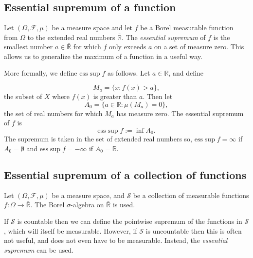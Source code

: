 \documentclass{article}
\newcommand{\reals}{\mathbb{R}}
\newcommand{\set}[1]{\{#1\}}
\newcommand{\defined}{:=}
\begin{document}

\subsection*{Essential supremum of a function}

Let $(\Omega, \mathcal{F}, \mu)$ be a measure space and let $f$ be a Borel measurable function from $\Omega$ to the extended real numbers $\mathbb{\bar R}$.  The \emph{essential supremum} of $f$ is the smallest number $a\in\mathbb{\bar R}$ for which $f$ only exceeds $a$ on a set of measure zero. This allows us to generalize the maximum of a function in a useful way.

More formally, we define $\mathrm{ess } \sup f$ as follows.  Let $a \in \reals$, and define

\begin{equation*}
M_{a} = \set{x: f(x) > a},
\end{equation*}
the subset of $X$ where $f(x)$ is greater than $a$.  Then let
\begin{equation*}
A_{0} = \set{a \in \reals: \mu(M_a) = 0},
\end{equation*}
the set of real numbers for which $M_a$ has measure zero. The essential supremum of $f$ is
\begin{equation*}
\mathrm{ess } \sup f \defined \inf A_0.
\end{equation*}
The supremum is taken in the set of extended real numbers so, $\mathrm{ess}\sup f=\infty$ if $A_0=\emptyset$ and $\mathrm{ess}\sup f = -\infty$ if $A_0=\mathbb{R}$. 

\subsection*{Essential supremum of a collection of functions}

Let $(\Omega,\mathcal{F},\mu)$ be a measure space, and $\mathcal{S}$ be a collection of measurable functions $f\colon\Omega\rightarrow\mathbb{\bar R}$. The Borel $\sigma$-algebra on $\mathbb{\bar R}$ is used.

If $\mathcal{S}$ is countable then we can define the pointwise supremum of the functions in $\mathcal{S}$, which will itself be measurable. However, if $\mathcal{S}$ is uncountable then this is often not useful, and does not even have to be measurable. Instead, the \emph{essential supremum} can be used.
\end{document}
